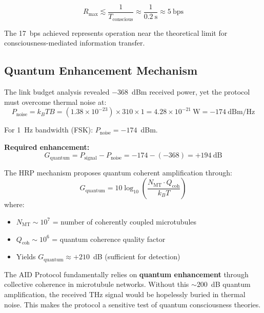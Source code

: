 \begin{equation}
R_{\text{max}} \lesssim \frac{1}{T_{\text{conscious}}} \approx \frac{1}{0.2~\text{s}} \approx 5~\text{bps}
\end{equation}

The 17~bps achieved represents operation near the theoretical limit for consciousness-mediated information transfer.

\subsection{Quantum Enhancement Mechanism}

The link budget analysis revealed $-368$~dBm received power, yet the protocol must overcome thermal noise at:
\begin{equation}
P_{\text{noise}} = k_B T B = (1.38 \times 10^{-23}) \times 310 \times 1 = 4.28 \times 10^{-21}~\text{W} = -174~\text{dBm/Hz}
\end{equation}

For 1~Hz bandwidth (FSK): $P_{\text{noise}} = -174$~dBm.

\textbf{Required enhancement:}
\begin{equation}
G_{\text{quantum}} = P_{\text{signal}} - P_{\text{noise}} = -174 - (-368) = +194~\text{dB}
\end{equation}

The HRP mechanism proposes quantum coherent amplification through:
\begin{equation}
G_{\text{quantum}} = 10\log_{10}\left(\frac{N_{\text{MT}} \cdot Q_{\text{coh}}}{k_B T}\right)
\end{equation}
where:
\begin{itemize}
\item $N_{\text{MT}} \sim 10^7$ = number of coherently coupled microtubules
\item $Q_{\text{coh}} \sim 10^6$ = quantum coherence quality factor
\item Yields $G_{\text{quantum}} \approx +210$~dB (sufficient for detection)
\end{itemize}

\begin{keyconcept}
The AID Protocol fundamentally relies on \textbf{quantum enhancement} through collective coherence in microtubule networks. Without this $\sim 200$~dB quantum amplification, the received THz signal would be hopelessly buried in thermal noise. This makes the protocol a sensitive test of quantum consciousness theories.
\end{keyconcept}

